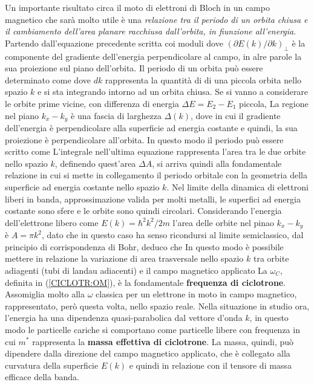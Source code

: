 Un importante risultato circa il moto di elettroni di Bloch in un campo magnetico che sar\`a molto utile \`e una \textit{relazione tra il periodo di un orbita chiusa e il cambiamento dell'area planare racchiusa dall'orbita, in fiunzione all'energia}. Partendo dall'equazione precedente scritta coi moduli
dove $(\partial E(k)/ \partial k)_\perp$ \`e la componente del gradiente dell'energia perpendicolare al campo, in alre parole la sua proiezione sul piano dell'orbita. Il periodo di un orbita pu\`o essere determinato come 
dove  $dk$ rappresenta la quantit\`a di di una piccola orbita nello spazio $k$ e si sta integrando intorno ad un orbita chiusa. Se si vanno a considerare le orbite prime vicine, con differenza di energia $\Delta E = E_2-E_1$ piccola, La regione nel piano $k_x-k_y$ \`e una fascia di larghezza $\Delta(k)$, dove 
in cui il gradiente dell'energia \`e perpendicolare alla superficie ad energia costante e quindi, la sua proiezione \`e perpendicolare all'orbita. In questo modo il periodo pu\`o essere scritto come
L'integrale nell'ultima equazione rappresenta l'area tra le due orbite nello spazio $k$, definendo quest'area $\Delta A$, si arriva quindi alla fondamentale relazione
in cui si mette in collegamento il periodo orbitale con la geometria della superficie ad energia costante nello spazio $k$. Nel limite della dinamica di elettroni liberi in banda, approssimazione valida per molti metalli, le superfici ad energia costante sono sfere e le orbite sono quindi circolari. Considerando l'energia dell'elettrone libero come $E(k) = \hbar^2 k^2 / 2 m $ l'area delle orbite nel pinao $k_x-k_y$ \`e $A=\pi k^2$, dato che in questo caso ha senso ricondursi al limite semiclassico, dal principio di corrispondenza di Bohr, deduco che
In questo modo \`e possibile mettere in relazione la variazione di area trasversale nello spazio $k$ tra orbite adiagenti (tubi di landau adiacenti) e il campo magnetico applicato
La $\omega_C$, definita in (\ref{CICLOTR:OM}), \`e la fondamentale \textbf{frequenza di ciclotrone}. Assomiglia molto alla $\omega$  classica per un elettrone in moto in campo magnetico, rappresentato, per\`o questa volta, nello spazio reale. 
Nella situazione in studio ora, l'energia ha una dipendenza quasi-parabolica dal vettore d'onda $k$, in questo modo le particelle cariche si comportano come particelle libere con frequenza
in cui $m^*$ rappresenta la \textbf{massa effettiva di ciclotrone}. La massa, quindi, pu\`o dipendere dalla direzione del campo magnetico applicato, che \`e collegato alla curvatura della superficie $E(k)$ e quindi in relazione con il tensore di massa efficace della banda.
